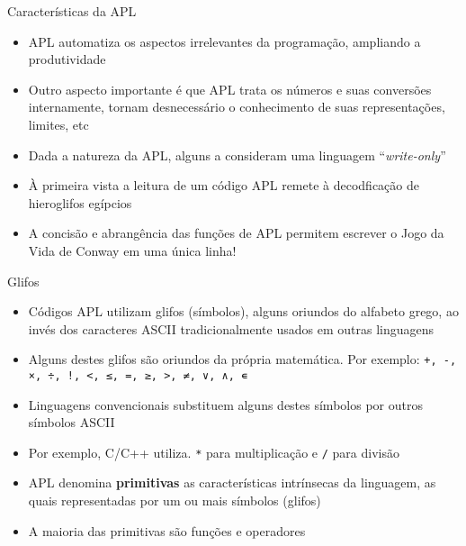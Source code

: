 \begin{frame}[fragile]{Características da APL}

    \begin{itemize}
        \item APL automatiza os aspectos irrelevantes da programação, ampliando a produtividade
        \pause

        \item Outro aspecto importante é que APL trata os números e suas conversões internamente, tornam desnecessário o conhecimento de suas representações, limites, etc
        \pause

        \item Dada a natureza da APL, alguns a consideram uma linguagem ``\textit{write-only}''
        \pause

        \item À primeira vista a leitura de um código APL remete à decodficação de hieroglifos egípcios
        \pause

        \item A concisão e abrangência das funções de APL permitem escrever o Jogo da Vida de Conway em uma única linha!
        \pause

    \end{itemize}

\end{frame}

\begin{frame}[fragile]{Glifos}

    \begin{itemize}
        \item Códigos APL utilizam glifos (símbolos), alguns oriundos do alfabeto grego, ao invés dos caracteres ASCII tradicionalmente usados em outras linguagens
        \pause

        \item Alguns destes glifos são oriundos da própria matemática. Por exemplo: \texttt{+, -, ×, ÷, !, <, ≤, =, ≥, >, ≠, ∨, ∧, ∊}
        \pause

        \item Linguagens convencionais substituem alguns destes símbolos por outros símbolos ASCII
        \pause


        \item Por exemplo, C/C++ utiliza. \texttt{*} para multiplicação e  \texttt{/} para divisão
        \pause

        \item APL denomina \textbf{primitivas} as características intrínsecas da linguagem, as quais representadas por um ou mais símbolos (glifos)
        \pause

        \item A maioria das primitivas são funções e operadores
    \end{itemize}

\end{frame}

